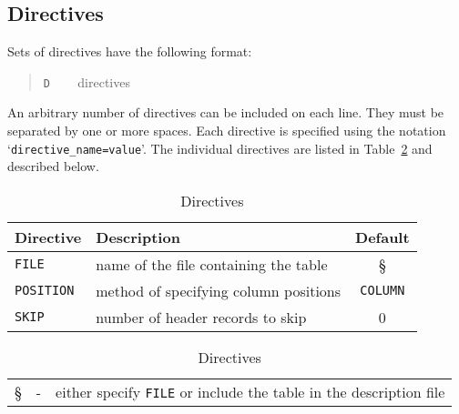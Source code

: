 \documentclass[twoside,11pt]{starlink}
\begin{document}
\subsection{Directives \label{DIR}}

Sets of directives have the following format:

\begin{quote}
\texttt{D} ~~~ directives
\end{quote}

An arbitrary number of directives can be included on each line.  They
must be separated by one or more spaces.  Each directive is specified
using the notation `\texttt{directive\_name=value}'.  The individual
directives are listed in Table~\ref{DIRECT} and described below.

\begin{table}[htbp]

\begin{center}
\begin{tabular}{llc}
Directive  & Description               & Default \\ \hline
\texttt{FILE} & name of the file containing the table       & \S           \\
\texttt{POSITION}   & method of specifying column positions & \texttt{COLUMN} \\
\texttt{SKIP} & number of header records to skip            & 0            \\
\end{tabular}

\vspace{1cm}

\begin{tabular}{rcl}
 \S        & - & either specify \texttt{FILE} or include the table in the description file \\
\end{tabular}

\caption{Directives \label{DIRECT} }
\end{center}

\end{table}
\end{document}
